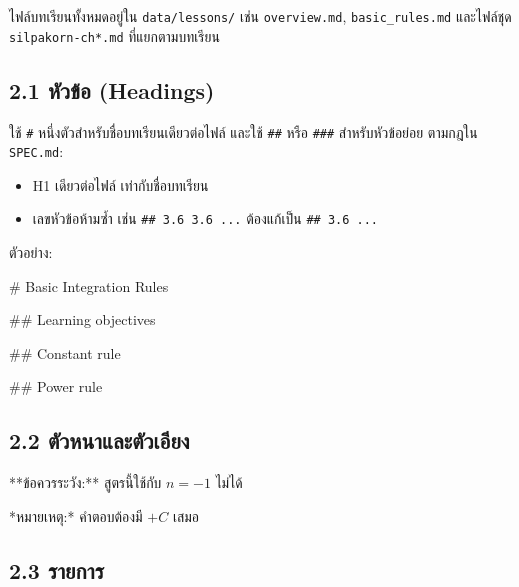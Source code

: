 \documentclass[
  thai,
  12pt,
  letterpaper,
  DIV=11,
  numbers=noendperiod]{scrartcl}
\newenvironment{Shaded}{\begin{snugshade}}{\end{snugshade}}
\newcommand{\FunctionTok}[1]{\textcolor[rgb]{0.28,0.35,0.67}{#1}}
\newcommand{\NormalTok}[1]{\textcolor[rgb]{0.00,0.23,0.31}{#1}}
\providecommand{\tightlist}{%
  \setlength{\itemsep}{0pt}\setlength{\parskip}{0pt}}
\begin{document}
ไฟล์บทเรียนทั้งหมดอยู่ใน \texttt{data/lessons/} เช่น \texttt{overview.md},
\texttt{basic\_rules.md} และไฟล์ชุด \texttt{silpakorn-ch*.md}
ที่แยกตามบทเรียน

\subsection{2.1 หัวข้อ (Headings)}\label{uxe2buxe27uxe02uxe2d-headings}

ใช้ \texttt{\#} หนึ่งตัวสำหรับชื่อบทเรียนเดียวต่อไฟล์ และใช้ \texttt{\#\#} หรือ
\texttt{\#\#\#} สำหรับหัวข้อย่อย ตามกฎใน \texttt{SPEC.md}:

\begin{itemize}
\tightlist
\item
  H1 เดียวต่อไฟล์ เท่ากับชื่อบทเรียน
\item
  เลขหัวข้อห้ามซ้ำ เช่น \texttt{\#\#\ 3.6\ 3.6\ ...} ต้องแก้เป็น
  \texttt{\#\#\ 3.6\ ...}
\end{itemize}

ตัวอย่าง:

\begin{Shaded}
\begin{Highlighting}[]
\FunctionTok{\# Basic Integration Rules}

\FunctionTok{\#\# Learning objectives}

\FunctionTok{\#\# Constant rule}

\FunctionTok{\#\# Power rule}
\end{Highlighting}
\end{Shaded}

\subsection{2.2
ตัวหนาและตัวเอียง}\label{uxe15uxe27uxe2buxe19uxe32uxe41uxe25uxe30uxe15uxe27uxe40uxe2duxe22uxe07}

\begin{Shaded}
\begin{Highlighting}[]
\NormalTok{**ข้อควรระวัง:** สูตรนี้ใช้กับ $n={-}1$ ไม่ได้}

\NormalTok{*หมายเหตุ:* คำตอบต้องมี $+C$ เสมอ}
\end{Highlighting}
\end{Shaded}

\subsection{2.3 รายการ}\label{uxe23uxe32uxe22uxe01uxe32uxe23}
\end{document}
